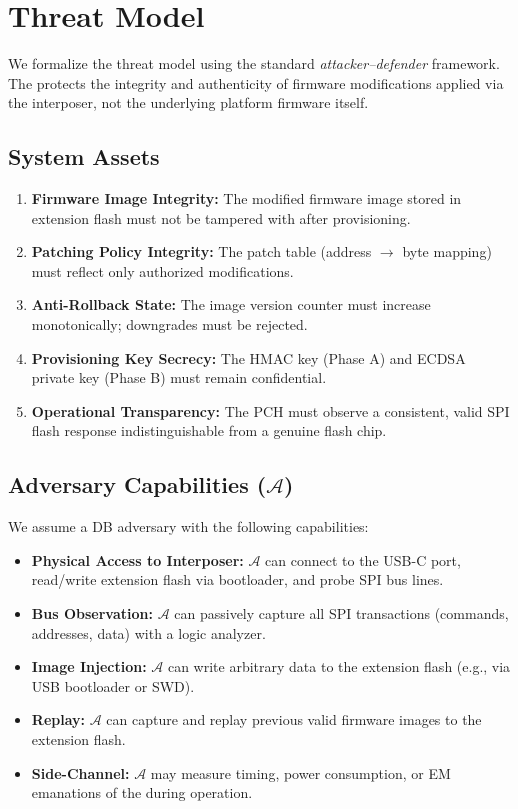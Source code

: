 \section{Threat Model}
\label{sec:threat_model}

We formalize the threat model using the standard \textit{attacker--defender} framework. The \vbfc protects the integrity and authenticity of firmware modifications applied via the interposer, not the underlying platform firmware itself.

\subsection{System Assets}
\begin{enumerate}
    \item \textbf{Firmware Image Integrity:} The modified firmware image stored in extension flash must not be tampered with after provisioning.
    \item \textbf{Patching Policy Integrity:} The patch table (address $\to$ byte mapping) must reflect only authorized modifications.
    \item \textbf{Anti-Rollback State:} The image version counter must increase monotonically; downgrades must be rejected.
    \item \textbf{Provisioning Key Secrecy:} The \ac{HMAC} key (Phase A) and ECDSA private key (Phase B) must remain confidential.
    \item \textbf{Operational Transparency:} The \ac{PCH} must observe a consistent, valid \ac{SPI} flash response indistinguishable from a genuine flash chip.
\end{enumerate}

\subsection{Adversary Capabilities ($\mathcal{A}$)}
We assume a \acf{DB} adversary with the following capabilities:
\begin{itemize}
    \item \textbf{Physical Access to Interposer:} $\mathcal{A}$ can connect to the \vbfc USB-C port, read/write extension flash via \rp bootloader, and probe \ac{SPI} bus lines.
    \item \textbf{Bus Observation:} $\mathcal{A}$ can passively capture all \ac{SPI} transactions (commands, addresses, data) with a logic analyzer.
    \item \textbf{Image Injection:} $\mathcal{A}$ can write arbitrary data to the extension flash (e.g., via \rp USB bootloader or \ac{SWD}).
    \item \textbf{Replay:} $\mathcal{A}$ can capture and replay previous valid firmware images to the extension flash.
    \item \textbf{Side-Channel:} $\mathcal{A}$ may measure timing, power consumption, or EM emanations of the \rp during operation.
\end{itemize}

